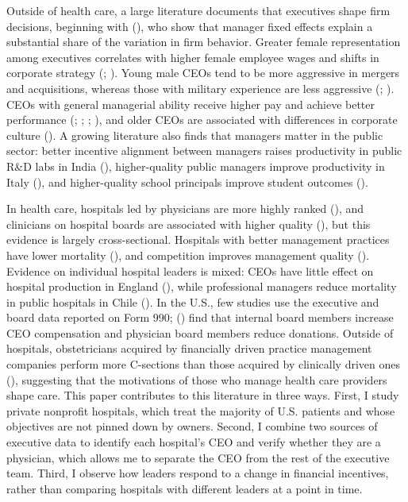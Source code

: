 \documentclass[12pt]{article}
\theoremstyle{definition}   %
\begin{document}
    Outside of health care, a large literature documents that executives shape firm decisions, beginning with \citeauthor{bertrand2003managing} (\citeyear{bertrand2003managing}), who show that manager fixed effects explain a substantial share of the variation in firm behavior. Greater female representation among executives correlates with higher female employee wages and shifts in corporate strategy (\cite{matsa2013female}; \cite{flabbi2019female}). Young male CEOs tend to be more aggressive in mergers and acquisitions, whereas those with military experience are less aggressive (\cite{levi2010deal}; \cite{benmelech2015military}). CEOs with general managerial ability receive higher pay and achieve better performance (\cite{kaplan2012ceo}; \cite{custodio2013generalists}; \cite{adams2018director}; \cite{frydman2019rising}), and older CEOs are associated with differences in corporate culture (\cite{graham2022corporate}). A growing literature also finds that managers matter in the public sector: better incentive alignment between managers raises productivity in public R\&D labs in India (\cite{choudhury2020managers}), higher-quality public managers improve productivity in Italy (\cite{fenizia2022managers}), and higher-quality school principals improve student outcomes (\cite{lavy2023effects}).

    In health care, hospitals led by physicians are more highly ranked (\cite{goodall2011physician}), and clinicians on hospital boards are associated with higher quality (\cite{veronesi2013clinicians}), but this evidence is largely cross-sectional. Hospitals with better management practices have lower mortality (\cite{mcconnell2013management}), and competition improves management quality (\cite{bloom2015impact}). Evidence on individual hospital leaders is mixed: CEOs have little effect on hospital production in England (\cite{janke2019impact}), while professional managers reduce mortality in public hospitals in Chile (\cite{munoz2025managers}). In the U.S., few studies use the executive and board data reported on Form 990; \citeauthor{brickley2010board} (\citeyear{brickley2010board}) find that internal board members increase CEO compensation and physician board members reduce donations. Outside of hospitals, obstetricians acquired by financially driven practice management companies perform more C-sections than those acquired by clinically driven ones (\cite{la2023impact}), suggesting that the motivations of those who manage health care providers shape care. This paper contributes to this literature in three ways. First, I study private nonprofit hospitals, which treat the majority of U.S. patients and whose objectives are not pinned down by owners. Second, I combine two sources of executive data to identify each hospital's CEO and verify whether they are a physician, which allows me to separate the CEO from the rest of the executive team. Third, I observe how leaders respond to a change in financial incentives, rather than comparing hospitals with different leaders at a point in time.
\end{document}
